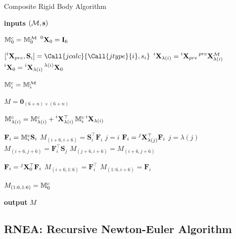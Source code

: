 \begin{algorithm}
\caption{Composite Rigid Body Algorithm}
\label{algo:crba}
\begin{algorithmic}[1]
\small

\State \textbf{inputs} $(\mathcal{M}, \Shape)$

\State $\masssix^c_0 = \masssix_0^{\mathcal{M}}$
\State $\transvel[0]_0 = \eye_6$

    \State $[\transvel[i]_{pre}, \mathbf{S}_i] = \Call{jcalc}{\Call{jtype}{i}, s_i}$
    \State $\transvel[i]_{\lambda(i)} = \transvel[i]_{pre} \transvel[pre]_{\lambda(i)}^{\mathcal{M}}$
    \State $\transvel[i]_{0} = \transvel[i]_{\lambda(i)} \transvel[\lambda(i)]_0$

    \State $\masssix^c_i = \masssix_i^{\mathcal{M}}$
\EndFor

\State $M = \boldsymbol{0}_{(6+n)\times(6+n)}$

    \State $\masssix^c_{\lambda(i)} = \masssix^c_{\lambda(i)} + \transvel[i]_{\lambda(i)}^\top \masssix^c_i \transvel[i]_{\lambda(i)}$
    
    \State $\mathbf{F}_i = \masssix^c_i \mathbf{S}_i$
    \State $M_{(i+6,i+6)} = \mathbf{S}_i^\top \mathbf{F}_i$
    \State $j = i$
        \State $\mathbf{F}_i = \transvel[j]_{\lambda(j)}^\top \mathbf{F}_i$
        \State $j = \lambda(j)$
        \State $M_{(i+6,j+6)} = \mathbf{F}^\top_i \mathbf{S}_j$
        \State $M_{(j+6,i+6)} = M_{(i+6,j+6)}$
    \EndWhile

    \State $\mathbf{F}_i = \transvel[j]_0^\top \mathbf{F}_i$
    \State $M_{(i+6, 1:6)} = \mathbf{F}_i^\top$
    \State $M_{(1:6, i+6)} = \mathbf{F}_i$
\EndFor

\State $M_{(1:6, 1:6)} = \masssix^c_0$

\State \textbf{output} $M$

\end{algorithmic}
\end{algorithm}

\subsection{RNEA: Recursive Newton-Euler Algorithm}

